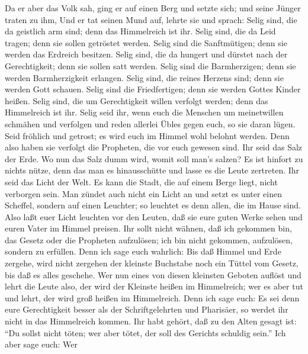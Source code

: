  Da er aber das Volk sah, ging er auf einen Berg und setzte
sich; und seine Jünger traten zu ihm,  Und er tat seinen
Mund auf, lehrte sie und sprach:  Selig sind, die da
geistlich arm sind; denn das Himmelreich ist ihr.  Selig
sind, die da Leid tragen; denn sie sollen getröstet werden. 
Selig sind die Sanftmütigen; denn sie werden das Erdreich besitzen.
 Selig sind, die da hungert und dürstet nach der
Gerechtigkeit; denn sie sollen satt werden.  Selig sind die
Barmherzigen; denn sie werden Barmherzigkeit erlangen. 
Selig sind, die reines Herzens sind; denn sie werden Gott schauen.
 Selig sind die Friedfertigen; denn sie werden Gottes Kinder
heißen.  Selig sind, die um Gerechtigkeit willen verfolgt
werden; denn das Himmelreich ist ihr.  Selig seid ihr, wenn
euch die Menschen um meinetwillen schmähen und verfolgen und reden
allerlei Übles gegen euch, so sie daran lügen.  Seid
fröhlich und getrost; es wird euch im Himmel wohl belohnt werden. Denn
also haben sie verfolgt die Propheten, die vor euch gewesen sind.
 Ihr seid das Salz der Erde. Wo nun das Salz dumm wird,
womit soll man's salzen? Es ist hinfort zu nichts nütze, denn das man es
hinausschütte und lasse es die Leute zertreten.  Ihr seid
das Licht der Welt. Es kann die Stadt, die auf einem Berge liegt, nicht
verborgen sein.  Man zündet auch nicht ein Licht an und
setzt es unter einen Scheffel, sondern auf einen Leuchter; so leuchtet
es denn allen, die im Hause sind.  Also laßt euer Licht
leuchten vor den Leuten, daß sie eure guten Werke sehen und euren Vater
im Himmel preisen.  Ihr sollt nicht wähnen, daß ich
gekommen bin, das Gesetz oder die Propheten aufzulösen; ich bin nicht
gekommen, aufzulösen, sondern zu erfüllen.  Denn ich sage
euch wahrlich: Bis daß Himmel und Erde zergehe, wird nicht zergehen der
kleinste Buchstabe noch ein Tüttel vom Gesetz, bis daß es alles
geschehe.  Wer nun eines von diesen kleinsten Geboten
auflöst und lehrt die Leute also, der wird der Kleinste heißen im
Himmelreich; wer es aber tut und lehrt, der wird groß heißen im
Himmelreich.  Denn ich sage euch: Es sei denn eure
Gerechtigkeit besser als der Schriftgelehrten und Pharisäer, so werdet
ihr nicht in das Himmelreich kommen.  Ihr habt gehört, daß
zu den Alten gesagt ist: ``Du sollst nicht töten; wer aber tötet, der
soll des Gerichts schuldig sein.''  Ich aber sage euch: Wer
